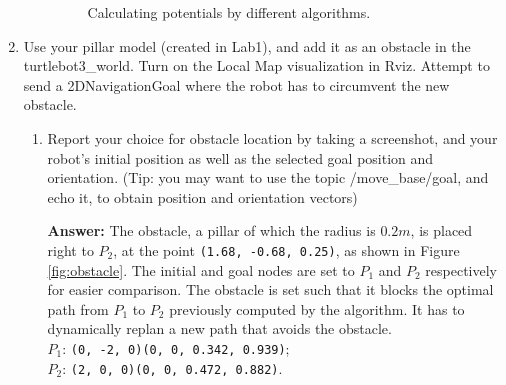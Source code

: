 \documentclass[12pt]{article}
\begin{document}
\begin{enumerate}
\begin{enumerate}
        \begin{figure}[h!]
            \centering
            \hspace{3ex}
            \caption{Calculating potentials by different algorithms.}
            \label{fig:potentials}\vspace{-10pt}
        \end{figure}

    \end{enumerate}
    
    \item Use your pillar model (created in Lab1), and add it as an obstacle in the turtlebot3\_world. Turn on the Local Map visualization in Rviz. Attempt to send a 2DNavigationGoal where the robot has to circumvent the new obstacle.
    \begin{enumerate}
        \item Report your choice for obstacle location by taking a screenshot, and your robot’s initial position as well as the selected goal position and orientation. (Tip: you may want to use the topic /move\_base/goal, and echo it, to obtain position and orientation vectors)
        
        \textbf{Answer: }The obstacle, a pillar of which the radius is $0.2m$, is placed right to $P_2$, at the point \texttt{(1.68, -0.68, 0.25)}, as shown in Figure \ref{fig:obstacle}. The initial and goal nodes are set to $P_1$ and $P_2$ respectively for easier comparison. The obstacle is set such that it blocks the optimal path from $P_1$ to $P_2$ previously computed by the algorithm. It has to dynamically replan a new path that avoids the obstacle.
        \\$P_1$: \texttt{(0, -2, 0)(0, 0, 0.342, 0.939)};\\$P_2$: \texttt{(2, 0, 0)(0, 0, 0.472, 0.882)}.
        

\end{enumerate}
\end{enumerate}
\end{document}
